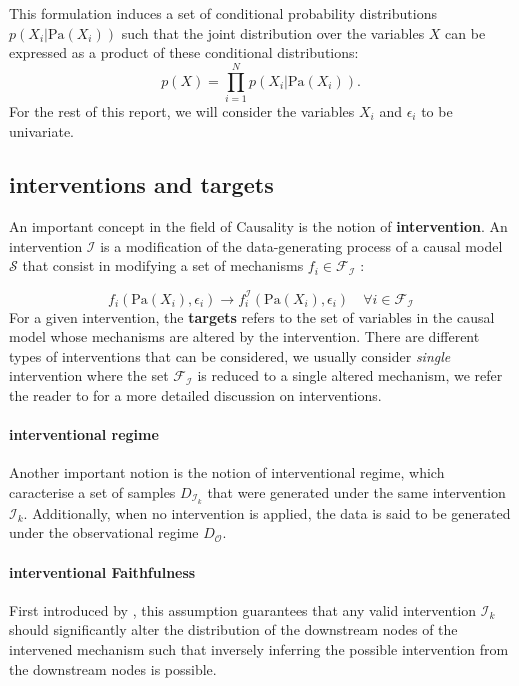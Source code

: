 \documentclass{article}
\begin{document}
This formulation induces a set of conditional probability distributions $p(X_i | \text{Pa}(X_i))$ such that the joint distribution over the variables $X$ can be expressed as a product of these conditional distributions:
$$p(X) = \prod_{i = 1}^N p(X_i | \text{Pa}(X_i)).$$
For the rest of this report, we will consider the variables $X_i$ and $\epsilon_i$ to be univariate.

\subsection{interventions and targets}
An important concept in the field of Causality is the notion of \textbf{intervention}. An intervention $\mathcal{I}$ is a modification of the data-generating process of a causal model $\mathcal{S}$ that consist in modifying a set of mechanisms $f_i \in \mathcal{F}_{\mathcal{I}}$ :

\begin{equation}
    f_i(\text{Pa}(X_i), \epsilon_i) \rightarrow f_i^{\mathcal{I}}(\text{Pa}(X_i), \epsilon_i) \quad \forall i \in \mathcal{F}_{\mathcal{I}}
\end{equation}
For a given intervention, the \textbf{targets} refers to the set of variables in the causal model whose mechanisms are altered by the intervention. There are different types of interventions that can be considered, we usually consider \textit{single} intervention where the set $\mathcal{F}_{\mathcal{I}}$ is reduced to a single altered mechanism, we refer the reader to \citet{Pearl_2009} for a more detailed discussion on interventions.

\paragraph{interventional regime}
Another important notion is the notion of interventional regime, which caracterise a set of samples $D_{\mathcal{I}_k}$  that were generated under the same intervention $\mathcal{I}_k$. Additionally, when no intervention is applied, the data is said to be generated under the observational regime $D_{\mathcal{O}}$.

\paragraph{interventional Faithfulness} First introduced by \citet{chevalley2024derivingcausalordersinglevariable}, this assumption guarantees that any valid intervention $\mathcal{I}_k$ should significantly alter the distribution of the downstream nodes of the intervened mechanism such that inversely inferring the possible intervention from the downstream nodes is possible.
\end{document}
